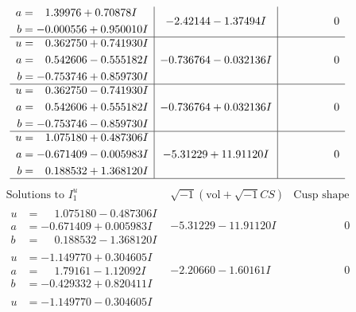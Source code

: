 \documentclass[1p]{elsarticle_modified}
\theoremstyle{definition}
\newcommand{\I}{\sqrt{-1}}
\begin{document}
$$\begin{array}{c|c|c}
\begin{aligned}
a &= \phantom{-}1.39976 + 0.70878 I \\
b &= -0.000556 + 0.950010 I\end{aligned}
 & -2.42144 - 1.37494 I & \phantom{-0.000000 } 0 \\ \hline\begin{aligned}
u &= \phantom{-}0.362750 + 0.741930 I \\
a &= \phantom{-}0.542606 - 0.555182 I \\
b &= -0.753746 + 0.859730 I\end{aligned}
 & -0.736764 - 0.032136 I & \phantom{-0.000000 } 0 \\ \hline\begin{aligned}
u &= \phantom{-}0.362750 - 0.741930 I \\
a &= \phantom{-}0.542606 + 0.555182 I \\
b &= -0.753746 - 0.859730 I\end{aligned}
 & -0.736764 + 0.032136 I & \phantom{-0.000000 } 0 \\ \hline\begin{aligned}
u &= \phantom{-}1.075180 + 0.487306 I \\
a &= -0.671409 - 0.005983 I \\
b &= \phantom{-}0.188532 + 1.368120 I\end{aligned}
 & -5.31229 + 11.91120 I & \phantom{-0.000000 } 0\\
 \hline 
 \end{array}$$\newpage$$\begin{array}{c|c|c}  
\text{Solutions to }I^u_{1}& \I (\text{vol} + \sqrt{-1}CS) & \text{Cusp shape}\\
 \hline 
\begin{aligned}
u &= \phantom{-}1.075180 - 0.487306 I \\
a &= -0.671409 + 0.005983 I \\
b &= \phantom{-}0.188532 - 1.368120 I\end{aligned}
 & -5.31229 - 11.91120 I & \phantom{-0.000000 } 0 \\ \hline\begin{aligned}
u &= -1.149770 + 0.304605 I \\
a &= \phantom{-}1.79161 - 1.12092 I \\
b &= -0.429332 + 0.820411 I\end{aligned}
 & -2.20660 - 1.60161 I & \phantom{-0.000000 } 0 \\ \hline\begin{aligned}
u &= -1.149770 - 0.304605 I \\

\end{aligned}
\end{array}$$
\end{document}
